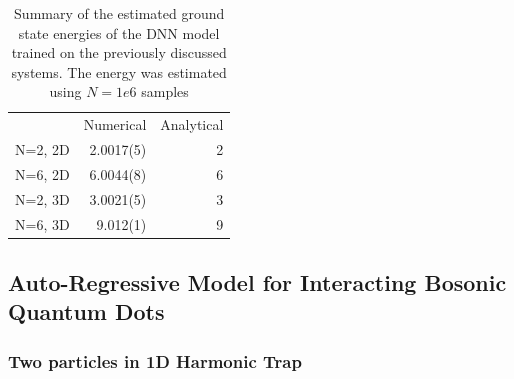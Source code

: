 \begin{table}[ht]
	\begin{tabular}{r|rr}
		\toprule
		& Numerical& Analytical     \\
		N=2, 2D    & 2.0017(5) &  2 \\
		N=6, 2D    & 6.0044(8) &  6 \\
		N=2, 3D    & 3.0021(5) &  3 \\
		N=6, 3D    & 9.012(1)  &  9 \\
		\bottomrule
	\end{tabular}
	\caption{Summary of the estimated ground state energies of the DNN model trained on the previously discussed systems. The energy was estimated using $N=1e6$ samples}
	\label{tab:1}
\end{table}


\subsection{Auto-Regressive Model for Interacting Bosonic Quantum Dots}
\subsubsection{Two particles in 1D Harmonic Trap}


\subsection{}




